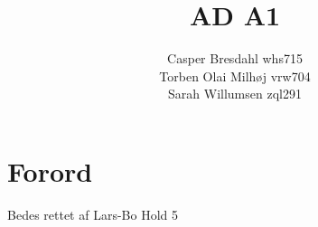 \documentclass[12pt]{article}
\title{AD A1}
\author{Casper Bresdahl whs715\\ Torben Olai Milhøj vrw704\\ Sarah Willumsen zql291\\ }
\begin{document}
        \maketitle
        \pagestyle{fancy}
        \chead{}
        \lhead{}
        \rhead{}
        \renewcommand{\headrulewidth}{0pt}

        \tableofcontents
        
        \section*{Forord}
        Bedes rettet af Lars-Bo Hold 5
        
        \newpage
        
        
        
        
        
        
        
        
        
\end{document}
